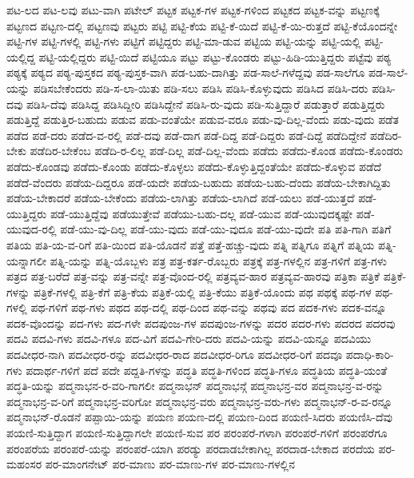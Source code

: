 {ಪಟ-ಲದ
ಪಟ-ಲವು
ಪಟು-ವಾಗಿ
ಪಟೇಲ್
ಪಟ್ಟಕ
ಪಟ್ಟಕ-ಗಳ
ಪಟ್ಟಕ-ಗಳಿಂದ
ಪಟ್ಟಕದ
ಪಟ್ಟಕ-ವನ್ನು
ಪಟ್ಟಣಕ್ಕೆ
ಪಟ್ಟಣದ
ಪಟ್ಟಣ-ದಲ್ಲಿ
ಪಟ್ಟಣವು
ಪಟ್ಟರು
ಪಟ್ಟಿ
ಪಟ್ಟಿ-ಕೆಯ
ಪಟ್ಟಿ-ಕೆ-ಯಿದೆ
ಪಟ್ಟಿ-ಕೆ-ಯಿ-ರುತ್ತದೆ
ಪಟ್ಟಿ-ಕೆಯೊಂದನ್ನೇ
ಪಟ್ಟಿ-ಗಳ
ಪಟ್ಟಿ-ಗಳಲ್ಲಿ
ಪಟ್ಟಿ-ಗಳು
ಪಟ್ಟಿಗೆ
ಪಟ್ಟಿದ್ದರು
ಪಟ್ಟಿ-ಮಾ-ಡುವ
ಪಟ್ಟಿಯ
ಪಟ್ಟಿ-ಯನ್ನು
ಪಟ್ಟಿ-ಯಲ್ಲಿ
ಪಟ್ಟಿ-ಯಲ್ಲಿದ್ದ
ಪಟ್ಟಿ-ಯಲ್ಲಿದ್ದರು
ಪಟ್ಟಿ-ಯಿದೆ
ಪಟ್ಟಿಯೂ
ಪಟ್ಟು
ಪಟ್ಟು-ಕೊಂಡರು
ಪಟ್ಟು-ಹಿಡಿ-ಯುತ್ತಿದ್ದರು
ಪಟ್ಟೆವು
ಪಠ್ಯ
ಪಠ್ಯಕ್ಕೆ
ಪಠ್ಯದ
ಪಠ್ಯ-ಪುಸ್ತಕದ
ಪಠ್ಯ-ಪುಸ್ತಕ-ವಾಗಿ
ಪಡ-ಬಹು-ದಾಗಿತ್ತು
ಪಡ-ಸಾಲೆ-ಗಳೆದ್ದವು
ಪಡ-ಸಾಲೆಗೂ
ಪಡ-ಸಾಲೆ-ಯನ್ನು
ಪಡಿಸಬೇಕೆಂದರು
ಪಡಿ-ಸ-ಲಾ-ಯಿತು
ಪಡಿ-ಸಲು
ಪಡಿಸಿ
ಪಡಿಸಿ-ಕೊಳ್ಳುವುದು
ಪಡಿಸಿದ
ಪಡಿಸಿ-ದರು
ಪಡಿಸಿ-ದವು
ಪಡಿಸಿ-ದೆವು
ಪಡಿಸಿದ್ದ
ಪಡಿಸಿದ್ದೀರಿ
ಪಡಿಸಿದ್ದೇನೆ
ಪಡಿಸಿ-ರು-ವುದು
ಪಡಿ-ಸುತ್ತಿದ್ದಾರೆ
ಪಡುತ್ತಾರೆ
ಪಡುತ್ತಿದ್ದರು
ಪಡುತ್ತಿದ್ದೆ
ಪಡುತ್ತಿರ-ಬಹುದು
ಪಡುವ
ಪಡು-ವಂತೆಯೇ
ಪಡುವ-ವರೂ
ಪಡು-ವು-ದಿಲ್ಲ-ವೆಂದು
ಪಡು-ವುದು
ಪಡೆತ
ಪಡೆದ
ಪಡೆ-ದರು
ಪಡೆದ-ವ-ರಲ್ಲಿ
ಪಡೆ-ದವು
ಪಡೆ-ದಾಗ
ಪಡೆ-ದಿದ್ದ
ಪಡೆ-ದಿದ್ದರು
ಪಡೆ-ದಿದ್ದೆ
ಪಡೆದಿದ್ದೇನೆ
ಪಡೆದಿರ-ಬೇಕು
ಪಡೆದಿರ-ಬೇಕೆಂಬ
ಪಡೆದಿ-ರ-ಲಿಲ್ಲ
ಪಡೆ-ದಿಲ್ಲ
ಪಡೆ-ದಿಲ್ಲ-ವೆಂದು
ಪಡೆದು
ಪಡೆದು-ಕೊಂಡ
ಪಡೆದು-ಕೊಂಡರು
ಪಡೆದು-ಕೊಂಡವು
ಪಡೆದು-ಕೊಂಡು
ಪಡೆದು-ಕೊಳ್ಳಲು
ಪಡೆದು-ಕೊಳ್ಳುತ್ತಿದ್ದಂತೆಯೇ
ಪಡೆದು-ಕೊಳ್ಳುವ
ಪಡೆದೆ
ಪಡೆದೆ-ವೆಂದರು
ಪಡೆಯ-ದಿದ್ದರೂ
ಪಡೆ-ಯದೇ
ಪಡೆಯ-ಬಹುದು
ಪಡೆಯ-ಬಹು-ದೆಂದು
ಪಡೆಯ-ಬೇಕಾಗಿದ್ದಿತು
ಪಡೆಯ-ಬೇಕಾದರೆ
ಪಡೆಯ-ಬೇಕೆಂದು
ಪಡೆಯ-ಲಾಗಿತ್ತು
ಪಡೆಯ-ಲಾಗಿದೆ
ಪಡೆ-ಯಲು
ಪಡೆ-ಯುತ್ತದೆ
ಪಡೆ-ಯುತ್ತಿದ್ದರು
ಪಡೆ-ಯುತ್ತಿದ್ದೆವು
ಪಡೆಯುತ್ತೇವೆ
ಪಡೆಯು-ಬಹು-ದಲ್ಲ
ಪಡೆ-ಯುವ
ಪಡೆ-ಯುವುದಕ್ಕಷ್ಟೇ
ಪಡೆ-ಯುವುದ-ರಲ್ಲಿ
ಪಡೆ-ಯು-ವು-ದಿಲ್ಲ
ಪಡೆ-ಯು-ವುದು
ಪಡೆ-ಯು-ವುದೂ
ಪಡೆ-ಯು-ವುದೇ
ಪತಿ
ಪತಿ-ಗಾಗಿ
ಪತಿಗೆ
ಪತಿಯ
ಪತಿ-ಯ-ವ-ರಿಗೆ
ಪತಿ-ಯಿಂದ
ಪತಿ-ಯೊಡನೆ
ಪತ್ತೆ
ಪತ್ತೆ-ಹಚ್ಚು-ವುದು
ಪತ್ನಿ
ಪತ್ನಿಗೂ
ಪತ್ನಿಗೆ
ಪತ್ನಿಯ
ಪತ್ನಿ-ಯನ್ನಾಗಲೀ
ಪತ್ನಿ-ಯನ್ನು
ಪತ್ನಿ-ಯೊಬ್ಬಳು
ಪತ್ರ
ಪತ್ರ-ಕರ್ತ-ರೊಬ್ಬರು
ಪತ್ರಕ್ಕೆ
ಪತ್ರ-ಗಳಲ್ಲಿನ
ಪತ್ರ-ಗಳಿಗೆ
ಪತ್ರ-ಗಳು
ಪತ್ರದ
ಪತ್ರ-ಬರೆದೆ
ಪತ್ರ-ವನ್ನು
ಪತ್ರ-ವನ್ನೇ
ಪತ್ರ-ವೊಂದ-ರಲ್ಲಿ
ಪತ್ರವ್ಯವ-ಹಾರ
ಪತ್ರವ್ಯವ-ಹಾರವು
ಪತ್ರಿಕಾ
ಪತ್ರಿಕೆ
ಪತ್ರಿಕೆ-ಗಳನ್ನು
ಪತ್ರಿಕೆ-ಗಳಲ್ಲಿ
ಪತ್ರಿ-ಕೆಗೆ
ಪತ್ರಿ-ಕೆಯ
ಪತ್ರಿಕೆ-ಯಲ್ಲಿ
ಪತ್ರಿ-ಕೆಯು
ಪತ್ರಿಕೆ-ಯೊಂದು
ಪಥ
ಪಥಕ್ಕೆ
ಪಥ-ಗಳ
ಪಥ-ಗಳಲ್ಲಿ
ಪಥ-ಗಳಿಗೆ
ಪಥ-ಗಳು
ಪಥದ
ಪಥ-ದಲ್ಲಿ
ಪಥ-ದಿಂದ
ಪಥ-ವನ್ನು
ಪಥವು
ಪದ
ಪದಕ-ಗಳು
ಪದಕ-ವನ್ನೂ
ಪದಕ-ವೊಂದನ್ನು
ಪದ-ಗಳು
ಪದ-ಗಳೇ
ಪದಪುಂಜ-ಗಳ
ಪದಪುಂಜ-ಗಳನ್ನು
ಪದರ
ಪದರ-ಗಳು
ಪದರದ
ಪದರವು
ಪದವಿ
ಪದವಿ-ಗಳು
ಪದವಿ-ಗಳೂ
ಪದ-ವಿಗೆ
ಪದವಿ-ಗೇರಿ-ದರು
ಪದವಿ-ಯನ್ನು
ಪದವಿ-ಯನ್ನೂ
ಪದವಿಯು
ಪದವೀಧರ-ನಾಗಿ
ಪದವೀಧರ-ರನ್ನು
ಪದವೀಧರ-ರಾದ
ಪದವೀಧರ-ರಿಗೂ
ಪದವೀಧರ-ರಿಗೆ
ಪದವೂ
ಪದಾಧಿ-ಕಾರಿ-ಗಳು
ಪದಾರ್ಥ-ಗಳಿಗೆ
ಪದೆ
ಪದೇ
ಪದ್ದತಿ-ಗಳನ್ನು
ಪದ್ಧತಿ
ಪದ್ಧತಿ-ಗಳಿಂದ
ಪದ್ಧತಿ-ಗಳೂ
ಪದ್ಧತಿಯ
ಪದ್ಧತಿ-ಯಂತೆ
ಪದ್ಧತಿ-ಯನ್ನು
ಪದ್ಮನಾಭನ-ರ-ವರಿ-ಗಾಗಲೀ
ಪದ್ಮನಾಭನ್
ಪದ್ಮನಾಭನ್ಗೆ
ಪದ್ಮನಾಭನ್ರ-ವರ
ಪದ್ಮನಾಭನ್ರ-ವ-ರನ್ನು
ಪದ್ಮನಾಭನ್ರ-ವ-ರಿಗೆ
ಪದ್ಮನಾಭನ್ರ-ವರಿಗೋ
ಪದ್ಮನಾಭನ್ರ-ವರು
ಪದ್ಮನಾಭನ್ರ-ವರು-ಗಳು
ಪದ್ಮನಾಭನ್-ರ-ವ-ರನ್ನೂ
ಪದ್ಮನಾಭನ್-ರೊಡನೆ
ಪಪ್ಪಾಯಿ-ಯನ್ನು
ಪಯಣ
ಪಯಣ-ದಲ್ಲಿ
ಪಯಣ-ದಿಂದ
ಪಯಣಿ-ಸಿದರು
ಪಯಣಿಸಿ-ದೆವು
ಪಯಣಿ-ಸುತ್ತಿದ್ದಾಗ
ಪಯಣಿ-ಸುತ್ತಿದ್ದಾಗಲೇ
ಪಯಣಿ-ಸುವ
ಪರ
ಪರಂಪರೆ-ಗಳಾಗಿ
ಪರಂಪರೆ-ಗಳಿಗೆ
ಪರಂಪರೆಗೂ
ಪರಂಪರೆಯ
ಪರಂಪರೆ-ಯನ್ನು
ಪರಂಪರೆ-ಯಾಗಿ
ಪರಡ್ಯು
ಪರದಾಡಬೇಕಾಗಿಲ್ಲ
ಪರದಾಡ-ಬೇಕಾದ
ಪರದೆಯ
ಪರ-ಮಹಂಸರ
ಪರ-ಮಾಂಗನೇಟ್
ಪರ-ಮಾಣು
ಪರ-ಮಾಣು-ಗಳ
ಪರ-ಮಾಣು-ಗಳಲ್ಲಿನ
}
